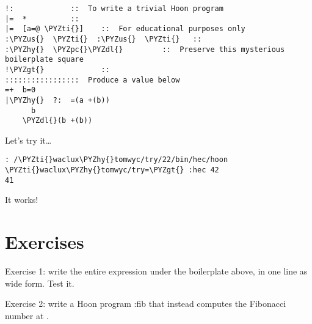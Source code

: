 \begin{framed_shaded}
\begin{Verbatim}[fontsize=\relsize{-2.5},fontseries=b,commandchars=\\\{\}]
!:             ::  To write a trivial Hoon program
|=  *          ::
|=  [a=@ \PYZti{}]    ::  For educational purposes only
:\PYZus{}  \PYZti{}  :\PYZus{}  \PYZti{}   ::
:\PYZhy{}  \PYZpc{}\PYZdl{}         ::  Preserve this mysterious boilerplate square
!\PYZgt{}             ::
:::::::::::::::::  Produce a value below
=+  b=0
|\PYZhy{}  ?:  =(a +(b))
      b
    \PYZdl{}(b +(b))
\end{Verbatim}
\end{framed_shaded}
Let's try it\ldots{}

\begin{framed_shaded}
\begin{Verbatim}[fontsize=\relsize{-2.5},fontseries=b,commandchars=\\\{\}]
: /\PYZti{}waclux\PYZhy{}tomwyc/try/22/bin/hec/hoon
\PYZti{}waclux\PYZhy{}tomwyc/try=\PYZgt{} :hec 42
41
\end{Verbatim}
\end{framed_shaded}
It works!

\section{Exercises}

Exercise 1: write the entire expression under the boilerplate
above, in one line as wide form.  Test it.

Exercise 2: write a Hoon program :fib that instead computes the
Fibonacci number at .